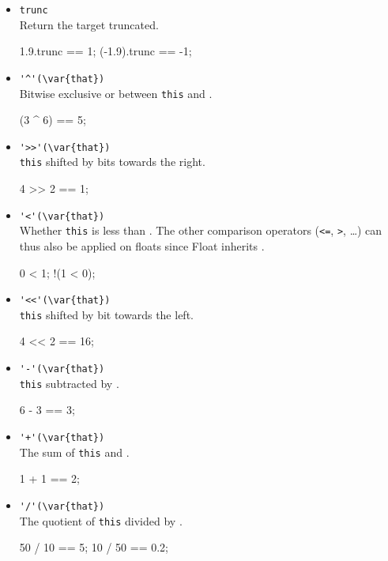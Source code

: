 \begin{itemize}
\item \lstinline|trunc|\\
  Return the target truncated.
\begin{urbiassert}
1.9.trunc == 1;
(-1.9).trunc == -1;
\end{urbiassert}

\item \lstinline|'^'(\var{that})|\\
  Bitwise exclusive or between \lstinline|this| and .
\begin{urbiassert}
(3 ^ 6) == 5;
\end{urbiassert}

\item \lstinline|'>>'(\var{that})|\\%
  \lstinline|this| shifted by  bits towards the right.
\begin{urbiassert}
4 >> 2 == 1;
\end{urbiassert}

\item \lstinline|'<'(\var{that})|\\
  Whether \lstinline|this| is less than . The other comparison
  operators (\lstinline|<=|, \lstinline|>|, \ldots) can thus also be
  applied on floats since Float inherits .
\begin{urbiassert}
  0 < 1;
!(1 < 0);
\end{urbiassert}

\item \lstinline|'<<'(\var{that})|\\
  \lstinline|this| shifted by  bit towards the left.
\begin{urbiassert}
4 << 2 == 16;
\end{urbiassert}

\item \lstinline|'-'(\var{that})|\\
  \lstinline|this| subtracted by .
\begin{urbiassert}
6 - 3 == 3;
\end{urbiassert}

\item \lstinline|'+'(\var{that})|\\
  The sum of \lstinline|this| and .
\begin{urbiassert}
1 + 1 == 2;
\end{urbiassert}

\item \lstinline|'/'(\var{that})|\\
  The quotient of \lstinline|this| divided by .
\begin{urbiassert}
50 / 10 == 5;
10 / 50 == 0.2;
\end{urbiassert}


\end{itemize}
